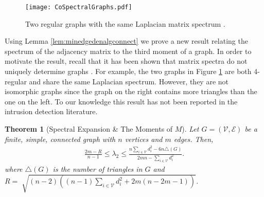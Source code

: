\documentclass[reqno,8pt]{amsart}
\newtheorem{theorem}{Theorem}
\theoremstyle{definition}
\theoremstyle{remark}
\numberwithin{equation}{section}
\def\cV{\mathcal{V}}
\def\cE{\mathcal{E}}
\begin{document}
\begin{figure}
    \centering
    \texttt{[image: CoSpectralGraphs.pdf]}
    \caption{Two regular graphs with the same Laplacian matrix spectrum \cite{Brouwer2011}.}
    \label{fig:cospectral}
\end{figure}
Using Lemma \ref{lem:minedgedenalgconnect} we prove a new result relating the spectrum of the adjacency matrix to the third moment of a graph. In order to motivate the result, recall that it has been shown that matrix spectra do not uniquely determine graphs \cite{God2001}. For example, the two graphs in Figure \ref{fig:cospectral} are both 4-regular and share the same Laplacian spectrum. However, they are not isomorphic graphs since the graph on the right contains more triangles than the one on the left. To our knowledge this result has not been reported in the intrusion detection literature. 
\begin{theorem}[Spectral Expansion \& The Moments of $M$]\label{thrm:algTriangle}
Let $G = (\cV, \cE)$ be a finite, simple, connected graph with $n$ vertices and $m$ edges. Then, 
\begin{align} \label{eq:nazInequality}
\frac{2m - R}{n-1} \leq \lambda_2 \leq \frac{n \displaystyle\sum_{i \in \cV}d_i^2 - 6n\triangle(G)}{2mn - \displaystyle\sum_{i \in \cV} d_i^2}.
\end{align}
where $\triangle(G)$ is the number of triangles in $G$ and $R = \sqrt[]{(n-2)\left ((n-1)\sum_{i \in \cV}d_i^2 + 2m(n-2m-1)\right)}$.
\end{theorem}
\end{document}
